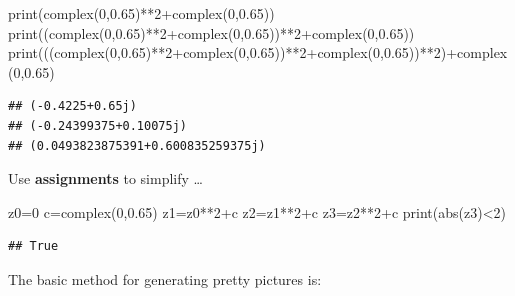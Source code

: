 \documentclass[]{tufte-handout}
\newenvironment{Shaded}{}{}
\newcommand{\DataTypeTok}[1]{\textcolor[rgb]{0.56,0.13,0.00}{{#1}}}
\newcommand{\DecValTok}[1]{\textcolor[rgb]{0.25,0.63,0.44}{{#1}}}
\newcommand{\FloatTok}[1]{\textcolor[rgb]{0.25,0.63,0.44}{{#1}}}
\newcommand{\NormalTok}[1]{{#1}}
\begin{document}
\begin{Shaded}
\begin{Highlighting}[]
\DataTypeTok{print}\NormalTok{(}\DataTypeTok{complex}\NormalTok{(}\DecValTok{0}\NormalTok{,}\FloatTok{0.65}\NormalTok{)**}\DecValTok{2}\NormalTok{+}\DataTypeTok{complex}\NormalTok{(}\DecValTok{0}\NormalTok{,}\FloatTok{0.65}\NormalTok{))}
\DataTypeTok{print}\NormalTok{((}\DataTypeTok{complex}\NormalTok{(}\DecValTok{0}\NormalTok{,}\FloatTok{0.65}\NormalTok{)**}\DecValTok{2}\NormalTok{+}\DataTypeTok{complex}\NormalTok{(}\DecValTok{0}\NormalTok{,}\FloatTok{0.65}\NormalTok{))**}\DecValTok{2}\NormalTok{+}\DataTypeTok{complex}\NormalTok{(}\DecValTok{0}\NormalTok{,}\FloatTok{0.65}\NormalTok{))}
\DataTypeTok{print}\NormalTok{(((}\DataTypeTok{complex}\NormalTok{(}\DecValTok{0}\NormalTok{,}\FloatTok{0.65}\NormalTok{)**}\DecValTok{2}\NormalTok{+}\DataTypeTok{complex}\NormalTok{(}\DecValTok{0}\NormalTok{,}\FloatTok{0.65}\NormalTok{))**}\DecValTok{2}\NormalTok{+}\DataTypeTok{complex}\NormalTok{(}\DecValTok{0}\NormalTok{,}\FloatTok{0.65}\NormalTok{))**}\DecValTok{2}\NormalTok{)+}\DataTypeTok{complex}\NormalTok{(}\DecValTok{0}\NormalTok{,}\FloatTok{0.65}\NormalTok{)}
\end{Highlighting}
\end{Shaded}

\begin{verbatim}
## (-0.4225+0.65j)
## (-0.24399375+0.10075j)
## (0.0493823875391+0.600835259375j)
\end{verbatim}

Use \textbf{assignments} to simplify \ldots{}

\begin{Shaded}
\begin{Highlighting}[]
\NormalTok{z0=}\DecValTok{0}
\NormalTok{c=}\DataTypeTok{complex}\NormalTok{(}\DecValTok{0}\NormalTok{,}\FloatTok{0.65}\NormalTok{)}
\NormalTok{z1=z0**}\DecValTok{2}\NormalTok{+c}
\NormalTok{z2=z1**}\DecValTok{2}\NormalTok{+c}
\NormalTok{z3=z2**}\DecValTok{2}\NormalTok{+c}
\DataTypeTok{print}\NormalTok{(}\DataTypeTok{abs}\NormalTok{(z3)<}\DecValTok{2}\NormalTok{)}
\end{Highlighting}
\end{Shaded}

\begin{verbatim}
## True
\end{verbatim}

The basic method for generating pretty pictures is:
\end{document}
